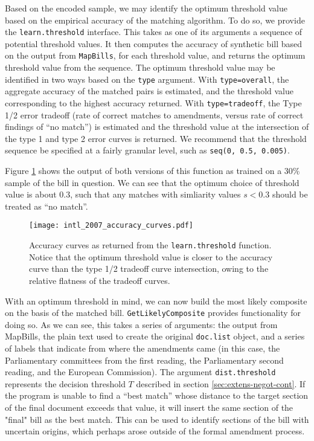 \documentclass[11pt]{article}
\begin{document}
Based on the encoded sample, we may identify the optimum threshold
value based on the empirical accuracy of the matching algorithm. To do
so, we provide the \texttt{learn.threshold} interface. This takes as
one of its arguments a sequence of potential threshold values. It then
computes the accuracy of synthetic bill based on the output from \texttt{MapBills},
for each threshold value, and returns the optimum threshold value from
the sequence. The optimum
threshold value may be identified in two ways based on the
\texttt{type} argument. With \texttt{type=overall},
the aggregate accuracy of the matched pairs is estimated, and the
threshold value corresponding to the highest accuracy returned. With
\texttt{type=tradeoff}, the Type 1/2 error tradeoff (rate of correct
matches to amendments, versus rate of correct findings of ``no match'') is estimated and
the threshold value at the intersection of the type 1 and type 2 error
curves is returned. We recommend that the threshold sequence be
specified at a fairly granular level, such as \texttt{seq(0, 0.5, 0.005)}.

Figure \ref{fig:learn-threshold-output} shows the
output of both versions of this function as trained on a 30\% sample
of the bill in question. We can see that the optimum choice of
threshold value is about 0.3, such that any matches with simliarity
values $s < 0.3$ should be treated as ``no match''.

\begin{figure}[ht]
  \centering
  \texttt{[image: intl\_2007\_accuracy\_curves.pdf]}
  \caption{Accuracy curves as returned from the \texttt{learn.threshold} function. Notice that the optimum threshold value is closer to the accuracy curve than the type 1/2 tradeoff curve intersection, owing to the relative flatness of the tradeoff curves.}
  \label{fig:learn-threshold-output}
\end{figure}

With an optimum threshold in mind, we can now build the most likely
composite on the basis of the matched
bill. \texttt{GetLikelyComposite} provides functionality for doing
so. As we can see, this takes a series of arguments: the output from
MapBills, the plain text used to create the original \texttt{doc.list}
object, and a series of labels that indicate from where the
amendments came (in this case, the Parliamentary committees from the
first reading, the Parliamentary second reading, and the European
Commission). The argument \texttt{dist.threshold} represents the decision threshold $T$ described in section
\ref{sec:extens-negot-cont}. If the program is unable to find a ``best match'' whose
distance to the target section of the final document exceeds that
value, it will insert the same section of the "final" bill as the best
match. This can be used to identify sections of the bill with
uncertain origins, which perhaps arose outside of the formal amendment
process. 
\end{document}
